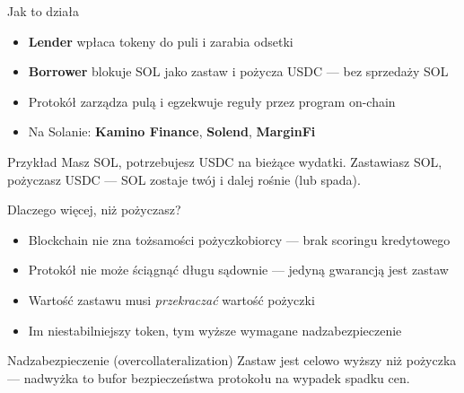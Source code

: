 \begin{frame}{Jak to działa}
\begin{center}
  \end{center}
  \vspace{0.1cm}
  \begin{itemize}
    \item \textbf{Lender} wpłaca tokeny do puli i zarabia odsetki
    \item \textbf{Borrower} blokuje SOL jako zastaw i pożycza USDC --- bez sprzedaży SOL
    \item Protokół zarządza pulą i egzekwuje reguły przez program on-chain
    \item Na Solanie: \textbf{Kamino Finance}, \textbf{Solend}, \textbf{MarginFi}
  \end{itemize}
  \vspace{0.1cm}
  \begin{exampleblock}{Przykład}
    Masz SOL, potrzebujesz USDC na bieżące wydatki. Zastawiasz SOL,
    pożyczasz USDC --- SOL zostaje twój i dalej rośnie (lub spada).
  \end{exampleblock}
\end{frame}

\begin{frame}{Dlaczego więcej, niż pożyczasz?}
  \begin{itemize}
    \item Blockchain nie zna tożsamości pożyczkobiorcy --- brak scoringu kredytowego
    \item Protokół nie może ściągnąć długu sądownie --- jedyną gwarancją jest zastaw
    \item Wartość zastawu musi \emph{przekraczać} wartość pożyczki
    \item Im niestabilniejszy token, tym wyższe wymagane nadzabezpieczenie
  \end{itemize}
  \vspace{0.3cm}
  \begin{block}{Nadzabezpieczenie (overcollateralization)}
    Zastaw jest celowo wyższy niż pożyczka --- nadwyżka to bufor bezpieczeństwa
    protokołu na wypadek spadku cen.
  \end{block}
\end{frame}

